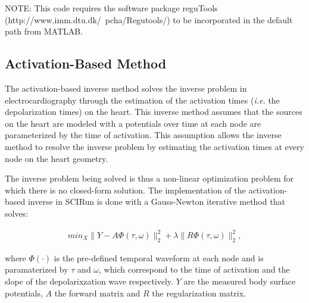     NOTE: This code requires the software package reguTools (http://www.imm.dtu.dk/~pcha/Regutools/) to be incorporated in the default path from MATLAB.



   
\subsection{Activation-Based Method}
    
    The activation-based inverse method solves the inverse problem in electrocardiography through the estimation of the activation times (\emph{i.e.} the depolarization times) on the heart.
    This inverse method assumes that the sources on the heart are modeled with a potentials over time at each node are parameterized  by the time of activation.
    This assumption allows the inverse method to resolve the inverse problem by estimating the activation times at every node on the heart geometry.
    
    The inverse problem being solved is thus a non-linear optimization problem for which there is no closed-form solution. 
    The implementation of the activation-based inverse in SCIRun is done with a Gauss-Newton iterative method that solves:
    \begin{center}
        \begin{eqnarray}
            min_{X} \|Y - A \Phi(\tau, \omega) \|^{2}_{2} + \lambda \| R\Phi(\tau, \omega) \|^{2}_{2},
        \label{eq:inverseSec_actBasedObj}
        \end{eqnarray}
    \end{center}
    where $\Phi(\cdot)$ is the pre-defined temporal waveform at each node and is paramaterized by $\tau$ and $\omega$, which correspond to the time of activation and the slope of the depolarixzation wave respectively.
    $Y$ are the measured body surface potentials, $A$ the forward matrix and $R$ the regularization matrix.
    
